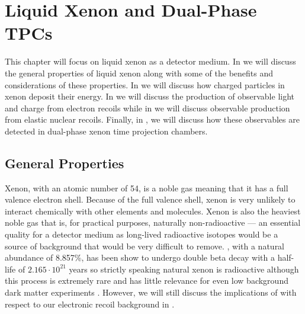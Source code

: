 

\pagestyle{cu}
\graphicspath{{./Chapter2/images/}}

\chapter[Liquid Xenon and Dual-Phase TPCs][Liquid Xenon and Dual-Phase TPCs]{Liquid Xenon and Dual-Phase TPCs}
\label{chap:lxe}

This chapter will focus on liquid xenon as a detector medium.  In  we will discuss the general properties of liquid xenon along with some of the benefits and considerations of these properties.  In  we will discuss how charged particles in xenon deposit their energy.  In  we will discuss the production of observable light and charge from electron recoils while in  we will discuss observable production from elastic nuclear recoils.  Finally, in , we will discuss how these observables are detected in dual-phase xenon time projection chambers.

\section{General Properties}
\label{sec:lxe_chem_properties}

Xenon, with an atomic number of 54, is a noble gas meaning that it has a full valence electron shell.  Because of the full valence shell, xenon is very unlikely to interact chemically with other elements and molecules.  Xenon is also the heaviest noble gas that is, for practical purposes, naturally non-radioactive --- an essential quality for a detector medium as long-lived radioactive isotopes would be a source of background that would be very difficult to remove.  , with a natural abundance of 8.857\%, has been show to undergo double beta decay with a half-life of $2.165 \cdot 10^{21}$ years so strictly speaking natural xenon is radioactive although this process is extremely rare and has little relevance for even low background dark matter experiments \cite{albert2014improved}.  However, we will still discuss the implications of   with respect to our electronic recoil background in .

